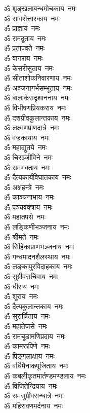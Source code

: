 \begin{multicols}{2}
\begin{flushleft}
ॐ शृङ्खलाबन्धमोचकाय~नमः\\
ॐ सागरोत्तारकाय~नमः\\
ॐ प्राज्ञाय~नमः\hfill{}\\
ॐ रामदूताय~नमः\\
ॐ प्रतापवते~नमः\\
ॐ वानराय~नमः\\
ॐ केसरीसुताय~नमः\\
ॐ सीताशोकनिवारणाय~नमः\\
ॐ अञ्जनागर्भसम्भूताय~नमः\\
ॐ बालार्कसदृशाननाय~नमः\\
ॐ विभीषणप्रियकराय~नमः\\
ॐ दशग्रीवकुलान्तकाय~नमः\\
ॐ लक्ष्मणप्राणदात्रे~नमः\hfill{}\\
ॐ वज्रकायाय~नमः\\
ॐ महाद्युतये~नमः\\
ॐ चिरञ्जीविने~नमः\\
ॐ रामभक्ताय~नमः\\
ॐ दैत्यकार्यविघातकाय~नमः\\
ॐ अक्षहन्त्रे~नमः\\
ॐ काञ्चनाभाय~नमः\\
ॐ पञ्चवक्त्राय~नमः\\
ॐ महातपसे~नमः\\
ॐ लङ्किणीभञ्जनाय~नमः\hfill{}\\
ॐ श्रीमते~नमः\\
ॐ सिंहिकाप्राणभञ्जनाय~नमः\\
ॐ गन्धमादनशैलस्थाय~नमः\\
ॐ लङ्कापुरविदाहकाय~नमः\\
ॐ सुग्रीवसचिवाय~नमः\\
ॐ धीराय~नमः\\
ॐ शूराय~नमः\\
ॐ दैत्यकुलान्तकाय~नमः\\
ॐ सुरार्चिताय~नमः\\
ॐ महातेजसे~नमः\hfill{}\\
ॐ रामचूडामणिप्रदाय~नमः\\
ॐ कामरूपिणे~नमः\\
ॐ पिङ्गलाक्षाय~नमः\\
ॐ वर्धिमैनाकपूजिताय~नमः\\
ॐ कबलीकृत\-मार्तण्डमण्डलाय~नमः\\
ॐ विजितेन्द्रियाय~नमः\\
ॐ रामसुग्रीवसन्धात्रे~नमः\\
ॐ महिरावणमर्दनाय~नमः\\

\end{flushleft}
\end{multicols}
